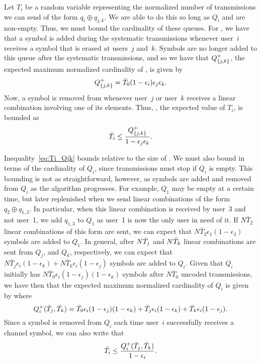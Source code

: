 Let $T_i$ be a random variable representing the normalized number of transmissions we can send of the form $q_i \oplus q_{j,k}$.  We are able to do this so long as $Q_i$ and  are non-empty.  Thus, we must bound the cardinality of these queues.  For , we have that a symbol is added during the systematic transmissions whenever user~$i$ receives a symbol that is erased at users~$j$ and~$k$.  Symbols are no longer added to this queue after the systematic transmissions, and so we have that $Q_{\{j,k\}}^{+}$, the  expected maximum normalized cardinality of , is given by
%
\begin{equation}
\label{eq:Qjk}
	Q_{\{j,k\}}^{+} = \bar{T}_0(1 - \epsilon_i)\epsilon_j\epsilon_k.
\end{equation}
%
Now, a symbol is removed from  whenever user~$j$ or user~$k$ receives a linear combination involving one of its elements.  Thus,  , the expected value of $T_i$, is bounded as
%
\begin{equation}
\label{eq:Ti_Qjk}
	\bar{T}_i \leq \frac{Q_{\{j,k\}}^{+}}{1 - \epsilon_j\epsilon_k}.
\end{equation}

Inequality~\eqref{eq:Ti_Qjk} bounds  relative to the size of .  We must also bound  in terms of the cardinality of $Q_i$, since transmissions must stop if $Q_i$ is empty.  This bounding is not as straightforward, however, as symbols are added and removed from $Q_i$ as the algorithm progresses.  For example, $Q_1$ may be empty at a certain time, but later replenished when we send linear combinations of the form $q_2 \oplus q_{1,3}$.  In particular, when this linear combination is received by user~3 and not user~1, we add $q_{1,3}$ to $Q_1$ as user~1 is now the only user in need of it. If $N\bar{T}_2$ linear combinations of this form are sent, we can expect that $N\bar{T}_2\epsilon_1(1 - \epsilon_3)$ symbols are added to $Q_1$.  In general, after $N\bar{T}_{j}$ and $N\bar{T}_{k}$ linear combinations are sent from $Q_j$,  and $Q_k$,  respectively, we can expect that $N\bar{T}_j\epsilon_i(1 - \epsilon_k) + N\bar{T}_k\epsilon_i(1 - \epsilon_j)$ symbols are added to $Q_i$.  Given that $Q_i$ initially has $N\bar{T}_0\epsilon_i(1 - \epsilon_j)(1 - \epsilon_k)$ symbols after $N\bar{T}_0$ uncoded transmissions, we have then that the expected maximum normalized cardinality of $Q_i$ is given by   where
%
\begin{equation}
\label{eq:Qi_plus}
	Q_{i}^{+}(\bar{T}_{j},\bar{T}_{k}) = \bar{T}_0\epsilon_i(1 - \epsilon_j)(1 - \epsilon_k) + \bar{T}_{j}\epsilon_i(1 - \epsilon_k) + \bar{T}_{k}\epsilon_i(1 - \epsilon_j).
\end{equation}
%
Since a symbol is removed from $Q_i$ each time user~$i$ successfully receives a channel symbol, we can also write that
%
\begin{equation}
\label{eq:Ti_Qi}
	\bar{T}_{i} \leq \frac{Q_{i}^{+}(\bar{T}_{j},\bar{T}_{k}) }{1 - \epsilon_i}.
\end{equation}

